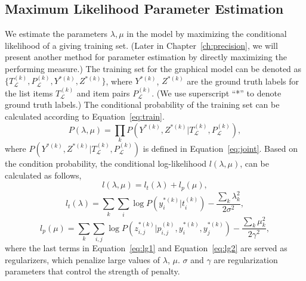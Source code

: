 \subsection{Maximum Likelihood Parameter Estimation}
\label{sec:facet-train}
We estimate the parameters $\lambda,\mu$ in the model by maximizing the conditional likelihood of a giving training set. (Later in Chapter~\ref{ch:precision}, we will present another method for parameter estimation by directly maximizing the performing measure.)
The training set for the graphical model can be denoted as
$\{T_{\mathcal{L}}^{(k)},P_{\mathcal{L}}^{(k)},Y^{*(k)},Z^{*(k)}\}$,
where $Y^{*(k)}$, $Z^{*(k)}$ are the ground truth labels for the list items $T_{\mathcal{L}}^{(k)}$ and item pairs $P_{\mathcal{L}}^{(k)}$. (We use superscript ``*'' to denote ground truth labels.)
The conditional probability of the training set can be calculated according to Equation~\ref{eq:train}.
\begin{equation}
\label{eq:train}
P(\lambda,\mu) = \prod_{k}{P(Y^{*(k)},Z^{*(k)}|T_{\mathcal{L}}^{(k)},P_{\mathcal{L}}^{(k)})},
\end{equation}
where $P(Y^{*(k)},Z^{*(k)}|T_{\mathcal{L}}^{(k)},P_{\mathcal{L}}^{(k)})$ is defined in Equation~\ref{eq:joint}. Based on the condition probability, the conditional log-likelihood $l(\lambda, \mu)$, can be calculated as follows,
\begin{equation}
\label{eq:ll}
l(\lambda,\mu) = l_t(\lambda) + l_p(\mu),
\end{equation}
\begin{equation}
\label{eq:lg1}
l_t(\lambda) = \sum_{k}{\sum_{i}{\log P(y_i^{*(k)}|t_i^{(k)})}} - \frac{\sum_{k}{\lambda_k^2}}{2 \sigma^2},
\end{equation}
\begin{equation}
\label{eq:lg2}
l_p(\mu) = \sum_{k}{\sum_{i,j}}{\log P(z_{i,j}^{*(k)}|p_{i,j}^{(k)},y_i^{*(k)},y_j^{*(k)})} -  \frac{\sum_{k}{\mu_k^2}}{2 \gamma^2},
\end{equation}
where the last terms in Equation~\ref{eq:lg1} and Equation~\ref{eq:lg2} are served as regularizers, which penalize large values of $\lambda$, $\mu$. $\sigma$ and $\gamma$ are regularization parameters that control the strength of penalty. 

